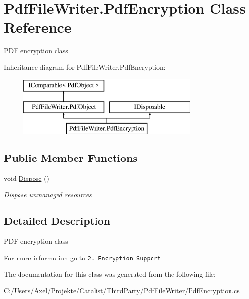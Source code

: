 \hypertarget{class_pdf_file_writer_1_1_pdf_encryption}{}\section{Pdf\+File\+Writer.\+Pdf\+Encryption Class Reference}
\label{class_pdf_file_writer_1_1_pdf_encryption}


P\+DF encryption class  


Inheritance diagram for Pdf\+File\+Writer.\+Pdf\+Encryption\+:\begin{figure}[H]
\begin{center}
\leavevmode
\includegraphics[height=3.000000cm]{class_pdf_file_writer_1_1_pdf_encryption}
\end{center}
\end{figure}
\subsection*{Public Member Functions}
\begin{DoxyCompactItemize}
\item 
void \hyperlink{class_pdf_file_writer_1_1_pdf_encryption_afd0898c85770047a5f51cb2012852c5b}{Dispose} ()\hypertarget{class_pdf_file_writer_1_1_pdf_encryption_afd0898c85770047a5f51cb2012852c5b}{}\label{class_pdf_file_writer_1_1_pdf_encryption_afd0898c85770047a5f51cb2012852c5b}

\begin{DoxyCompactList}\small\item\em Dispose unmanaged resources \end{DoxyCompactList}\end{DoxyCompactItemize}


\subsection{Detailed Description}
P\+DF encryption class 

For more information go to \href{http://www.codeproject.com/Articles/570682/PDF-File-Writer-Csharp-Class-Library-Version#EncryptionSupport}{\tt 2. Encryption Support} 

The documentation for this class was generated from the following file\+:\begin{DoxyCompactItemize}
\item 
C\+:/\+Users/\+Axel/\+Projekte/\+Catalist/\+Third\+Party/\+Pdf\+File\+Writer/Pdf\+Encryption.\+cs\end{DoxyCompactItemize}
